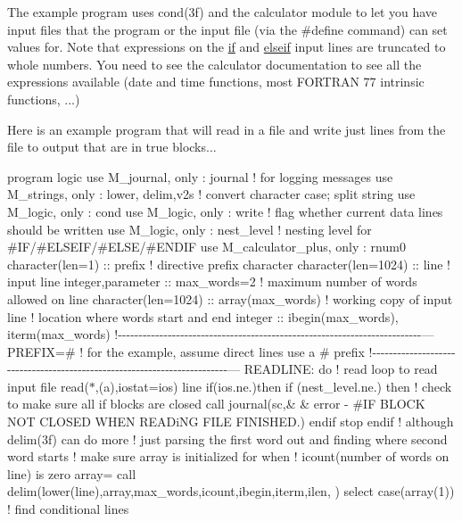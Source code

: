 The example program uses cond(3f) and the calculator module to let you have input files that the program or the input file (via the \#define command) can set values for. Note that expressions on the \hyperlink{namespacem__logic_a2229d0129ded7d8a34fce60334bc5938}{if} and \hyperlink{namespacem__logic_abb56458f58725800b593e986b23ec2d3}{elseif} input lines are truncated to whole numbers. You need to see the calculator documentation to see all the expressions available (date and time functions, most F\+O\+R\+T\+R\+AN 77 intrinsic functions, ...)

Here is an example program that will read in a file and write just lines from the file to output that are in true blocks...

program logic use M\+\_\+journal, only \+: journal ! for logging messages use M\+\_\+strings, only \+: lower, delim,v2s ! convert character case; split string use M\+\_\+logic, only \+: cond use M\+\_\+logic, only \+: write ! flag whether current data lines should be written use M\+\_\+logic, only \+: nest\+\_\+level ! nesting level for \#\+IF/\#\+E\+L\+S\+E\+IF/\#\+E\+L\+SE/\#\+E\+N\+D\+IF use M\+\_\+calculator\+\_\+plus, only \+: rnum0 character(len=1) \+:\+: prefix ! directive prefix character character(len=1024) \+:\+: line ! input line integer,parameter \+:\+: max\+\_\+words=2 ! maximum number of words allowed on line character(len=1024) \+:\+: array(max\+\_\+words) ! working copy of input line ! location where words start and end integer \+:\+: ibegin(max\+\_\+words), iterm(max\+\_\+words) !-\/-\/-\/-\/-\/-\/-\/-\/-\/-\/-\/-\/-\/-\/-\/-\/-\/-\/-\/-\/-\/-\/-\/-\/-\/-\/-\/-\/-\/-\/-\/-\/-\/-\/-\/-\/-\/-\/-\/-\/-\/-\/-\/-\/-\/-\/-\/-\/-\/-\/-\/-\/-\/-\/-\/-\/-\/-\/-\/-\/-\/-\/-\/-\/-\/-\/-\/-\/-\/-\/-\/-\/-\/--- P\+R\+E\+F\+IX=\textquotesingle{}\#\textquotesingle{} ! for the example, assume direct lines use a \# prefix !-\/-\/-\/-\/-\/-\/-\/-\/-\/-\/-\/-\/-\/-\/-\/-\/-\/-\/-\/-\/-\/-\/-\/-\/-\/-\/-\/-\/-\/-\/-\/-\/-\/-\/-\/-\/-\/-\/-\/-\/-\/-\/-\/-\/-\/-\/-\/-\/-\/-\/-\/-\/-\/-\/-\/-\/-\/-\/-\/-\/-\/-\/-\/-\/-\/-\/-\/-\/-\/-\/-\/-\/-\/--- R\+E\+A\+D\+L\+I\+NE\+: do ! read loop to read input file read($\ast$,\textquotesingle{}(a)\textquotesingle{},iostat=ios) line if(ios.\+ne.)then if (nest\+\_\+level.\+ne.) then ! check to make sure all if blocks are closed call journal(\textquotesingle{}sc\textquotesingle{},\& \& error -\/ \#\+IF B\+L\+O\+CK N\+OT C\+L\+O\+S\+ED W\+H\+EN R\+E\+A\+Di\+NG F\+I\+LE F\+I\+N\+I\+S\+H\+ED.\textquotesingle{}) endif stop endif ! although delim(3f) can do more ! just parsing the first word out and finding where second word starts ! make sure array is initialized for when ! icount(number of words on line) is zero array=\textquotesingle{} \textquotesingle{} call delim(lower(line),array,max\+\_\+words,icount,ibegin,iterm,ilen,\textquotesingle{} \textquotesingle{}) select case(array(1)) ! find conditional lines 